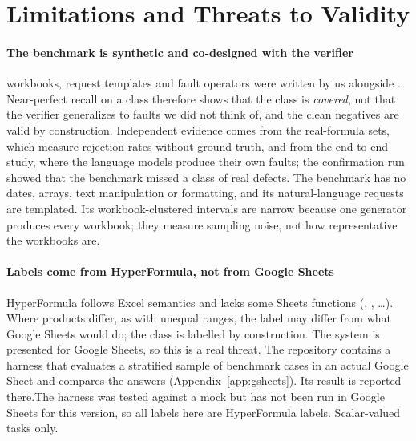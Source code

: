 \section{Limitations and Threats to Validity}
\label{sec:limitations}

\paragraph{The benchmark is synthetic and co-designed with the verifier}
\sheetfault{} workbooks, request templates and fault operators were written by us alongside \gc. Near-perfect recall on a class therefore shows that the class is \emph{covered}, not that the verifier generalizes to faults we did not think of, and the clean negatives are valid by construction. Independent evidence comes from the real-formula sets, which measure rejection rates without ground truth, and from the end-to-end study, where the language models produce their own faults; the confirmation run showed that the benchmark missed a class of real defects. The benchmark has no dates, arrays, text manipulation or formatting, and its natural-language requests are templated. Its workbook-clustered intervals are narrow because one generator produces every workbook; they measure sampling noise, not how representative the workbooks are.

\paragraph{Labels come from HyperFormula, not from Google Sheets}
HyperFormula follows Excel semantics and lacks some Sheets functions (, , \dots). Where products differ, as with unequal  ranges, the label may differ from what Google Sheets would do; the  class is labelled by construction. The system is presented for Google Sheets, so this is a real threat. The repository contains a harness that evaluates a stratified sample of benchmark cases in an actual Google Sheet and compares the answers (Appendix~\ref{app:gsheets}). \ifdefined\gsN Its result is reported there.\else The harness was tested against a mock but has not been run in Google Sheets for this version, so all labels here are HyperFormula labels.\fi{} Scalar-valued tasks only.

